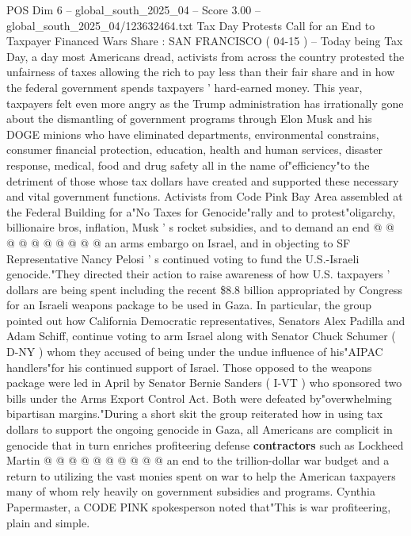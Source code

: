 \begin{textsample}{POS Dim 6 – global\_south\_2025\_04 – Score 3.00 – global\_south\_2025\_04/123632464.txt}  \label{ex:f6_pos_289}
Tax Day Protests Call for an End to Taxpayer Financed Wars Share : SAN FRANCISCO ( 04-15 ) -- Today being Tax Day, a day most Americans dread, activists from across the country protested the unfairness of taxes allowing the rich to pay less than their fair share and in how the federal government spends taxpayers ' hard-earned money.
This year, taxpayers felt even more angry as the Trump administration has irrationally gone about the dismantling of government programs through Elon Musk and his DOGE minions who have eliminated departments, environmental constrains, consumer financial protection, education, health and human services, disaster response, medical, food and drug safety all in the name of"efficiency"to the detriment of those whose tax dollars have created and supported these necessary and vital government functions.
Activists from Code Pink Bay Area assembled at the Federal Building for a"No Taxes for Genocide"rally and to protest"oligarchy, billionaire bros, inflation, Musk ' s rocket subsidies, and to demand an end @ @ @ @ @ @ @ @ @ @ an arms embargo on Israel, and in objecting to SF Representative Nancy Pelosi ' s continued voting to fund the U.S.-Israeli genocide."They directed their action to raise awareness of how U.S. taxpayers ' dollars are being spent including the recent \$8.8 billion appropriated by Congress for an Israeli weapons package to be used in Gaza.
In particular, the group pointed out how California Democratic representatives, Senators Alex Padilla and Adam Schiff, continue voting to arm Israel along with Senator Chuck Schumer ( D-NY ) whom they accused of being under the undue influence of his"AIPAC handlers"for his continued support of Israel.
Those opposed to the weapons package were led in April by Senator Bernie Sanders ( I-VT ) who sponsored two bills under the Arms Export Control Act.
Both were defeated by"overwhelming bipartisan margins."During a short skit the group reiterated how in using tax dollars to support the ongoing genocide in Gaza, all Americans are complicit in genocide that in turn enriches profiteering defense \textbf{contractors} such as Lockheed Martin @ @ @ @ @ @ @ @ @ @ an end to the trillion-dollar war budget and a return to utilizing the vast monies spent on war to help the American taxpayers many of whom rely heavily on government subsidies and programs.
Cynthia Papermaster, a CODE PINK spokesperson noted that"This is war profiteering, plain and simple.

\end{textsample}
